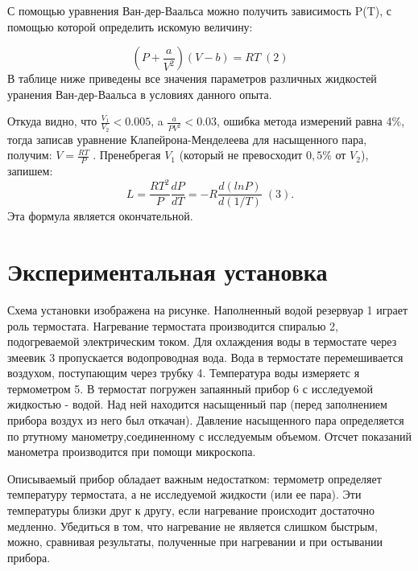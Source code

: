 \documentclass[a4paper,12pt]{article} %
\begin{document}
С помощью уравнения Ван-дер-Ваальса можно получить зависимость P(T), с помощью которой определить искомую величину:

$$(P+\frac{a}{V^2})(V-b)=RT \; (2)$$
В таблице ниже приведены все значения параметров различных жидкостей уранения Ван-дер-Ваальса в условиях данного опыта.
\begin{figure}[h]
\end{figure}

Откуда видно, что $\frac{V_1}{V_2} < 0.005$, a $\frac{a}{PV^2}<0.03$, ошибка метода измерений равна 4\%, тогда записав уравнение Клапейрона-Менделеева для насыщенного пара, получим:
$V=\frac{RT}{P}\;.$
Пренебрегая $V_1$ (который не превосходит $0,5\%$ от $V_2$), запишем:
$$L=\frac{RT^2}{P} \frac{dP}{dT} = -R\frac{d(lnP)}{d(1/T)}\;(3).$$
Эта формула является окончательной.

\medskip

\section{Экспериментальная установка}

Схема установки изображена на рисунке. Наполненный водой резервуар 1 играет роль термостата. Нагревание термостата производится спиралью 2, подогреваемой электрическим током. Для охлаждения воды в термостате через змеевик 3 пропускается водопроводная вода. Вода в термостате перемешивается воздухом,
поступающим через трубку 4. Температура воды измеряетс
я термометром 5. В термостат погружен запаянный прибор 6 с исследуемой жидкостью - водой. Над ней находится насыщенный пар (перед заполнением прибора воздух из него был откачан).
Давление насыщенного пара определяется по ртутному манометру,соединенному с исследуемым объемом. Отсчет показаний манометра производится при помощи микроскопа.

\medskip

\noindent Описываемый прибор обладает важным недостатком: термометр определяет температуру термостата, а не исследуемой жидкости (или ее пара). Эти температуры близки друг к другу, если нагревание происходит достаточно медленно. Убедиться в том, что нагревание не является слишком быстрым, можно, сравнивая результаты, полученные при нагревании и при остывании прибора.
\end{document}
